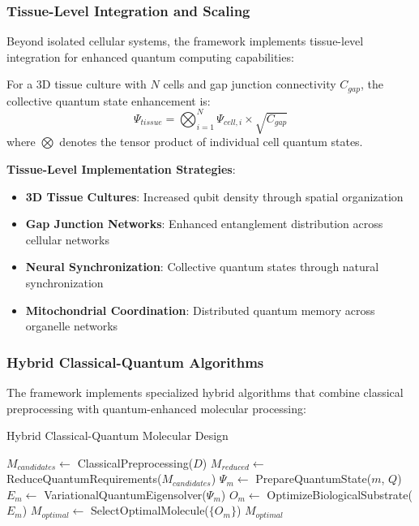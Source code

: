﻿\documentclass[11pt,a4paper]{article}
\begin{document}
\subsubsection{Tissue-Level Integration and Scaling}

Beyond isolated cellular systems, the framework implements tissue-level integration for enhanced quantum computing capabilities:

\begin{theorem}
For a 3D tissue culture with $N$ cells and gap junction connectivity $C_{gap}$, the collective quantum state enhancement is:
\begin{equation}
\Psi_{tissue} = \bigotimes_{i=1}^{N} \Psi_{cell,i} \times \sqrt{C_{gap}}
\end{equation}
where $\bigotimes$ denotes the tensor product of individual cell quantum states.
\end{theorem}

\textbf{Tissue-Level Implementation Strategies}:
\begin{itemize}
\item \textbf{3D Tissue Cultures}: Increased qubit density through spatial organization
\item \textbf{Gap Junction Networks}: Enhanced entanglement distribution across cellular networks
\item \textbf{Neural Synchronization}: Collective quantum states through natural synchronization
\item \textbf{Mitochondrial Coordination}: Distributed quantum memory across organelle networks
\end{itemize}

\subsubsection{Hybrid Classical-Quantum Algorithms}

The framework implements specialized hybrid algorithms that combine classical preprocessing with quantum-enhanced molecular processing:

\begin{algorithm}
\caption{Hybrid Classical-Quantum Molecular Design}
\begin{algorithmic}
    \State $M_{candidates} \leftarrow$ ClassicalPreprocessing($D$)
    \State $M_{reduced} \leftarrow$ ReduceQuantumRequirements($M_{candidates}$)
        \State $\Psi_m \leftarrow$ PrepareQuantumState($m$, $Q$)
        \State $E_m \leftarrow$ VariationalQuantumEigensolver($\Psi_m$)
        \State $O_m \leftarrow$ OptimizeBiologicalSubstrate($E_m$)
    \EndFor
    \State $M_{optimal} \leftarrow$ SelectOptimalMolecule($\{O_m\}$)
    \State \Return $M_{optimal}$
\EndProcedure
\end{algorithmic}
\end{algorithm}
\end{document}
